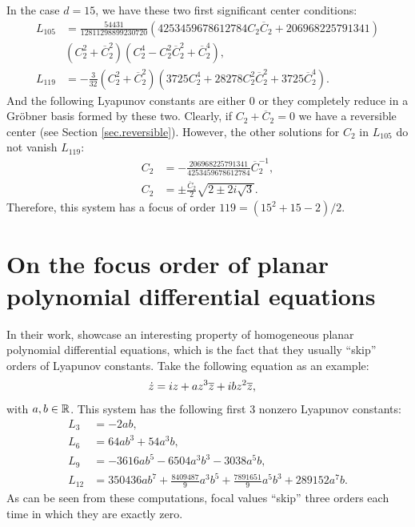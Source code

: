 In the case $d=15$, we have these two first significant center conditions:
\begin{align*}
L_{105}&=\frac{54431}{12811298899230720} (4253459678612784C_2\overline{C}_2+206968225791341)\\
&{}(C_2^2+\overline{C}_2^2)(C_2^4-C_2^2\overline{C}_2^2+\overline{C}_2^4),\\
L_{119}&=-\frac{3}{32}(C_2^2+\overline{C}_2^2)(3725C_2^4+28278C_2^2\overline{C}_2^2+3725\overline{C}_2^4).
\end{align*}
And the following Lyapunov constants are either 0 or they completely reduce in a Gröbner basis formed by these two. Clearly, if $C_2+\overline{C}_2=0$ we have a reversible center (see Section \ref{sec.reversible}). However, the other solutions for $C_2$ in $L_{105}$ do not vanish $L_{119}$:
\begin{align*}
C_2 &= -\frac{206968225791341}{4253459678612784}\overline{C}_2^{-1},\\
C_2 &= \pm\frac{\overline{C}_2}{2}\sqrt{2\pm2i\sqrt{3}}.
\end{align*}
Therefore, this system has a focus of order $119=(15^2+15-2)/2$.










\section{On the focus order of planar polynomial differential equations \parencite{Qiu2009}}

In  their work, \textcite{Qiu2009} showcase an interesting property of homogeneous planar polynomial differential equations, which is the fact that they usually ``skip'' orders of Lyapunov constants. Take the following equation as an example:
\begin{align}
\dot z &= iz + az^3\overline{z}+ibz^2\overline{z},
\end{align}
with $a,b\in\mathbb{R}$. This system has the following first 3 nonzero Lyapunov constants:
\begin{align*}
L_3 &= -2ab,\\
L_6 &= 64ab^3+54a^3b,\\
L_9 &= -3616ab^5 - 6504a^3b^3 - 3038a^5b,\\
L_{12} &= 350436ab^7 + \frac{8409487}{9}a^3b^5 + \frac{7891651}{9}a^5b^3 + 289152a^7b.
\end{align*}
As can be seen from these computations, focal values ``skip'' three orders each time in which they are exactly zero.

